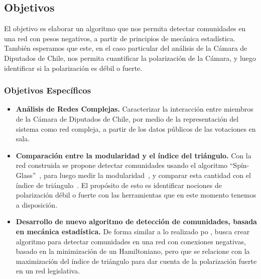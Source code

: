 \documentclass[hyperref]{proyectotesis}
\begin{document}
\subsection{Objetivos}

El objetivo es elaborar un algoritmo que nos permita detectar comunidades en una red con pesos negativos, a partir de principios de mecánica estadística. También esperamos que este, en el caso particular del análisis de la Cámara de Diputados de Chile, nos permita cuantificar la polarización de la Cámara, y luego identificar si la polarización es débil o fuerte.


\subsubsection*{Objetivos Específicos}
\begin{itemize}
\item    {\bf Análisis de Redes Complejas.} Caracterizar la interacción entre miembros de la Cámara de Diputados de Chile, por medio de la representación del sistema como red compleja, a partir de los datos públicos de las votaciones en sala.

\item{\bf Comparación entre la modularidad y el índice del triángulo.} Con la red construida se propone detectar comunidades usando el algoritmo ``Spín-Glass''~\cite{reichardt_statistical_2006}, para luego medir la modularidad~\cite{newman_finding_2004}, y comparar esta cantidad con el índice de triángulo~\cite{aref_measuring_2018}. El propósito de esto es identificar nociones de polarización débil o fuerte con las herramientas que en este momento tenemos a disposición.

\item {\bf Desarrollo de nuevo algoritmo de detección de comunidades, basada en mecánica estadística.} De forma similar a lo realizado po \citet{reichardt_statistical_2006}, busca crear algoritmo para detectar comunidades en una red con conexiones negativas, basado en la minimización de un Hamiltoniano, pero que se relacione con la maximización del índice de triángulo para dar cuenta de la polarización fuerte en un red legislativa.

\end{itemize}
\end{document}
